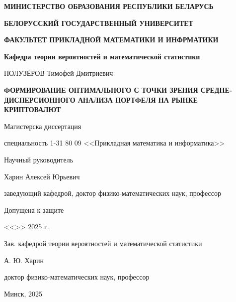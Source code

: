 \begin{titlepage}
    \begin{center}
       \textbf{МИНИСТЕРСТВО ОБРАЗОВАНИЯ РЕСПУБЛИКИ БЕЛАРУСЬ}

       \textbf{БЕЛОРУССКИЙ ГОСУДАРСТВЕННЫЙ УНИВЕРСИТЕТ}

       \textbf{ФАКУЛЬТЕТ ПРИКЛАДНОЙ МАТЕМАТИКИ И ИНФРМАТИКИ}

       \textbf{Кафедра теории вероятностей и математической статистики}
    \end{center}

    \vspace{15pt}

    \begin{center}
        ПОЛУЗЁРОВ Тимофей Дмитриевич
    \end{center}

    \begin{center}
        \textbf{ФОРМИРОВАНИЕ ОПТИМАЛЬНОГО С ТОЧКИ ЗРЕНИЯ СРЕДНЕ-ДИСПЕРСИОННОГО АНАЛИЗА ПОРТФЕЛЯ НА РЫНКЕ КРИПТОВАЛЮТ}
    \end{center}

    \begin{center}
        Магистерска диссертация

        специальность 1-31 80 09
        <<Прикладная математика и информатика>>
    \end{center}

    \vspace{10pt}

    \hfill
    \begin{minipage}{0.5\linewidth}
        \begin{flushleft}
            Научный руководитель
    
            Харин Алексей Юрьевич
    
            заведующий кафедрой, доктор физико-математических наук, профессор
    
        \end{flushleft}
    \end{minipage}

    \vspace{30pt}

    Допущена к защите

    <<\underline{\hspace{20pt}}>> \underline{\hspace{100pt}} 2025 г.

    Зав. кафедрой теории вероятностей и математической статистики

    \underline{\hspace{80pt}} А. Ю. Харин

    доктор физико-математических наук, профессор    

    \vspace{20pt}

    \begin{center}
        Минск, 2025
    \end{center}
\end{titlepage}
\setcounter{page}{2}